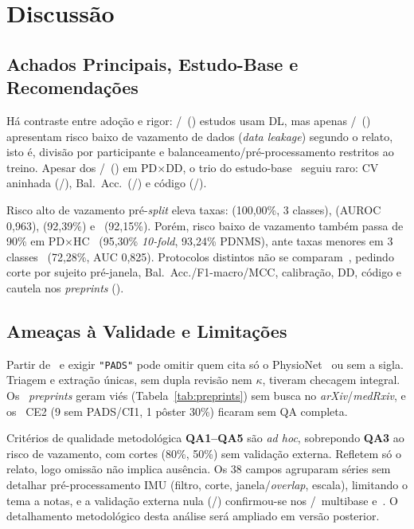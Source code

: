 \section{Discussão} \label{sec:discussao}

\subsection{Achados Principais, Estudo-Base e Recomendações}

Há contraste entre adoção e rigor: \nFamDL/\nTotal\ (\pctFamDL) estudos usam DL,
mas apenas \nRiscoBaixo/\nAplicaveisVaz\ (\pctRiscoBaixoAplic) apresentam risco
baixo de vazamento de dados (\textit{data leakage}) segundo o relato, isto é,
divisão por participante e balanceamento/pré-processamento restritos ao treino.
Apesar dos \nCenPDDD/\nTotal\ (\pctCenPDDD) em PD$\times$DD, o trio do
estudo-base~\cite{varghese_machine_2024} seguiu raro: CV aninhada
(\nValAninhada/\nTotal), Bal.\ Acc.\ (\nMetBalAcc/\nTotal) e código
(\nCodDisponivel/\nTotal).

Risco alto de vazamento pré-\textit{split} eleva taxas:
\cite{abioye_improving_2025} (100,00\%, 3 classes),
\cite{zannat_label-efficient_2026} (AUROC 0,963), \cite{wang_parkinsons_2025}
(92,39\%) e~\cite{yu_improved_2024} (92,15\%). Porém, risco baixo de vazamento
também passa de 90\% em PD$\times$HC~\cite{sridhar_early_2026,ouabd_parkinsons_2026}
(95,30\% \textit{10-fold}, 93,24\% PDNMS), ante taxas menores em 3
classes~\cite{zeebaree_three-class_2027,wei_sgc-rml_2026} (72,28\%, AUC 0,825).
Protocolos distintos não se comparam~\cite{pinto_neto_machine_2026,ouabd_overview_2026},
pedindo corte por sujeito pré-janela, Bal.\ Acc./F1-macro/MCC, calibração, DD,
código e cautela nos \textit{preprints} (\nPreprints).

\subsection{Ameaças à Validade e Limitações}

Partir de~\cite{varghese_machine_2024} e exigir \texttt{"PADS"} pode omitir quem
cita só o PhysioNet~\cite{PhysioNet-parkinsons-disease-smartwatch-1.0.0} ou sem a
sigla. Triagem e extração únicas, sem dupla revisão nem $\kappa$, tiveram
checagem integral. Os \nPreprints\ \textit{preprints} geram viés
(Tabela~\ref{tab:preprints}) sem busca no \textit{arXiv}/\textit{medRxiv}, e os
\nRejCEDois\ CE2 (9 sem PADS/CI1, 1 pôster 30\%) ficaram sem QA
completa.

Critérios de qualidade metodológica \textbf{QA1--QA5} são \textit{ad hoc}, sobrepondo
\textbf{QA3} ao risco de vazamento, com cortes (80\%, 50\%) sem validação
externa. Refletem só o relato, logo omissão não implica ausência. Os 38 campos
agruparam séries sem detalhar pré-processamento IMU
(filtro, corte, janela/\textit{overlap}, escala), limitando o tema a notas, e a
validação externa nula (\nValExtSim/\nTotal) confirmou-se nos
\nMultiBase/\nTotal\ multibase e~\cite{abioye_improving_2025}. O detalhamento
metodológico desta análise será ampliado em versão posterior.
